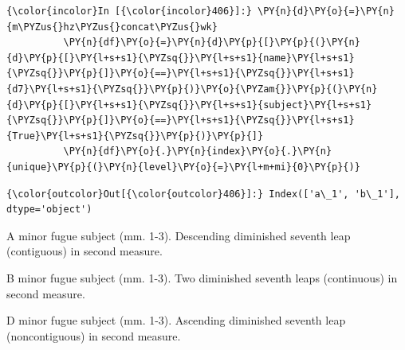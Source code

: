     \begin{Verbatim}[commandchars=\\\{\}]
{\color{incolor}In [{\color{incolor}406}]:} \PY{n}{d}\PY{o}{=}\PY{n}{m\PYZus{}hz\PYZus{}concat\PYZus{}wk}
          \PY{n}{df}\PY{o}{=}\PY{n}{d}\PY{p}{[}\PY{p}{(}\PY{n}{d}\PY{p}{[}\PY{l+s+s1}{\PYZsq{}}\PY{l+s+s1}{name}\PY{l+s+s1}{\PYZsq{}}\PY{p}{]}\PY{o}{==}\PY{l+s+s1}{\PYZsq{}}\PY{l+s+s1}{d7}\PY{l+s+s1}{\PYZsq{}}\PY{p}{)}\PY{o}{\PYZam{}}\PY{p}{(}\PY{n}{d}\PY{p}{[}\PY{l+s+s1}{\PYZsq{}}\PY{l+s+s1}{subject}\PY{l+s+s1}{\PYZsq{}}\PY{p}{]}\PY{o}{==}\PY{l+s+s1}{\PYZsq{}}\PY{l+s+s1}{True}\PY{l+s+s1}{\PYZsq{}}\PY{p}{)}\PY{p}{]}
          \PY{n}{df}\PY{o}{.}\PY{n}{index}\PY{o}{.}\PY{n}{unique}\PY{p}{(}\PY{n}{level}\PY{o}{=}\PY{l+m+mi}{0}\PY{p}{)}
\end{Verbatim}
\begin{Verbatim}[commandchars=\\\{\}]
{\color{outcolor}Out[{\color{outcolor}406}]:} Index(['a\_1', 'b\_1'], dtype='object')
\end{Verbatim}


\begin{Example}[H]
\vspace{1.5em}
    \centering
    \caption[Diminished seventh leap in a minor fugue subject (mm. 1-3). ]{ A minor fugue subject (mm. 1-3). Descending diminished seventh leap (contiguous) in second measure.}
\end{Example}    


\begin{Example}[H]
\vspace{1.5em}
    \centering
    \caption[Diminished seventh leap in b minor fugue subject (mm. 1-3). ]{ B minor fugue subject (mm. 1-3). Two diminished seventh leaps (continuous) in second measure.}
\end{Example}    


\begin{Example}[H]
\vspace{1.5em}
    \centering
    \caption[Diminished seventh leap (noncontiguous) in d minor fugue subject (mm. 1-3). ]{ D minor fugue subject (mm. 1-3). Ascending diminished seventh leap (noncontiguous) in second measure.}
\end{Example}    


